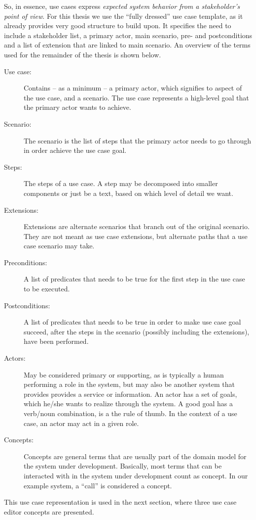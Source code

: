 \noindent So, in essence, use cases express \emph{expected system behavior from a stakeholder's point of view}. For this thesis we use the ``fully dressed'' use case template\cite{larman2005}, as it already provides very good structure to build upon. It specifies the need to include a stakeholder list, a primary actor, main scenario, pre- and postconditions and a list of extension that are linked to main scenario. An overview of the terms used for the remainder of the thesis is shown below.
\begin{description}

  \item[Use case:] Contains -- as a minimum -- a primary actor, which signifies to aspect of the use case, and a scenario. The use case represents a high-level goal that the primary actor wants to achieve.

  \item[Scenario:] The scenario is the list of steps that the primary actor needs to go through in order achieve the use case goal.

  \item[Steps:] The steps of a use case. A step may be decomposed into smaller components or just be a text, based on which level of detail we want. 

  \item[Extensions:] Extensions are alternate scenarios that branch out of the original scenario. They are not meant as use case extensions, but alternate paths that a use case scenario may take.

  \item[Preconditions:] A list of predicates that needs to be true for the first step in the use case to be executed.

  \item[Postconditions:] A list of predicates that needs to be true in order to make use case goal succeed, after the steps in the scenario (possibly including the extensions), have been performed.

  \item[Actors:] May be considered primary or supporting, as is typically a human performing a role in the system, but may also be another system that provides provides a service or information. An actor has a set of goals, which he/she wants to realize through the system. A good goal has a verb/noun combination, is a the rule of thumb. In the context of a use case, an actor may act in a given role.

  \item[Concepts:] Concepts are general terms that are usually part of the domain model for the system under development. Basically, most terms that can be interacted with in the system under development count as concept. In our example system, a ``call'' is considered a concept.

\end{description}
This use case representation is used in the next section, where three use case editor concepts are presented.




